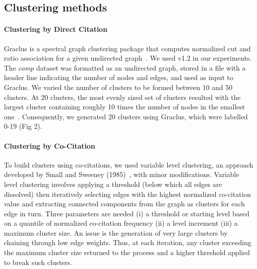 \subsection{Clustering methods}

\paragraph{Clustering by Direct Citation} Graclus is a spectral graph clustering package that computes normalized cut and ratio association for a given undirected graph~\cite{graclus_2007}.  We used v1.2 in our experiments.
The \emph{comp} dataset was formatted as an undirected graph, stored in a file with a header line indicating the number of nodes and edges, and used as input to Graclus. We varied the number of clusters to be formed between 10 and 50 clusters. At 20 clusters, the most evenly sized set of clusters resulted with the largest cluster containing roughly 10 times the number of nodes in the smallest one~\cite{traag_louvain_2019}. Consequently, we generated 20 clusters using Graclus, which were labelled 0-19 (Fig 2).

\paragraph{Clustering by Co-Citation} To build clusters using co-citations, we used variable level clustering, an approach developed by Small and Sweeney (1985)~\cite{small_clustering_1985}, with minor modifications. Variable level clustering involves applying a threshold (below which all edges are dissolved) then iteratively selecting edges with the highest normalized co-citation value and extracting connected components from the graph as clusters for each edge in turn. Three parameters are needed (i) a threshold or starting level based on a quantile of normalized co-citation frequency (ii) a level increment (iii) a maximum cluster size. An issue is the generation of very large clusters by chaining through low edge weights.  Thus, at each iteration, any cluster exceeding the maximum cluster size returned to the process and a higher threshold applied to break such clusters.

